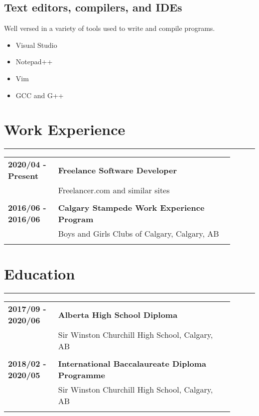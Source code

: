 \documentclass[letterpaper]{article}
\newcommand{\horizontalLine}{%
    \rule{\linewidth}{0.4pt}
    \vspace{1ex}
}
\begin{document}
        \subsection*{Text editors, compilers, and IDEs}
        Well versed in a variety of tools used to write and compile programs.

        \begin{itemize}[itemsep = 0pt]
            \item Visual Studio
            \item Notepad++
            \item Vim
            \item GCC and G++
        \end{itemize}

    \section*{Work Experience}

        \horizontalLine

        \begin{tabular}{p{0.2\linewidth} p{0.7\linewidth}} 
            \textbf{2020/04 - Present} & \large\textbf{Freelance Software Developer} \\
            & Freelancer.com and similar sites \\
            \\
            \textbf{2016/06 - 2016/06} & \large\textbf{Calgary Stampede Work Experience Program} \\
            & Boys and Girls Clubs of Calgary, Calgary, AB \\
            \\
        \end{tabular}

    \section*{Education}

        \horizontalLine

        \begin{tabular}{p{0.2\linewidth} p{0.7\linewidth}} 
            \textbf{2017/09 - 2020/06} & \large\textbf{Alberta High School Diploma} \\
            & Sir Winston Churchill High School, Calgary, AB \\
            \\
            \textbf{2018/02 - 2020/05} & \large\textbf{International Baccalaureate Diploma Programme} \\
            & Sir Winston Churchill High School, Calgary, AB \\
            \\
        \end{tabular}
\end{document}
